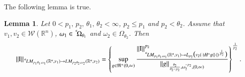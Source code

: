 \documentclass[11pt]{amsart}
\theoremstyle{plain}
\newtheorem{lem}[thm]{Lemma}
\theoremstyle{definition}
\numberwithin{thm}{section}
\numberwithin{equation}{section}
\begin{document}
The following lemma is true.
\begin{lem}\label{mainlemma}
	Let $0 < p_1, \,p_2, \,{\theta}_1, \,{\theta}_2 < \infty$, $p_2 \leq p_1$ and $p_2 < {\theta}_2$. Assume that $v_1, v_2\in {{\mathcal W}}({{\mathbb R}^n})$, ${\omega}_1 \in {\,^{^{\bf c}}\!}{{\Omega}_{{\theta}_1}}$ and ${\omega}_2\in {\Omega}_{{\theta}_2}$. Then
	\begin{align*}
	\|{\operatorname{I}}\|_{{\,^{^{\bf c}}\!} LM_{p_1{\theta}_1,{\omega}_1}({{\mathbb R}^n},v_1){\rightarrow} LM_{p_2{\theta}_2,{\omega}_2}({{\mathbb R}^n},v_2)}
	= \left\{\sup_{g\in {\mathfrak M}^+{(0,{\infty})}} {\frac{\displaystyle {\|{\operatorname{I}}\|_{{\,^{^{\bf c}}\!} LM_{p_1{\theta}_1,{\omega}_1}({{\mathbb R}^n},v_1){\rightarrow} L_{p_2}\big(v_2(\cdot)H^*g(|\cdot|)^{\frac{1}{p_2}}\big)}^{p_2}}}{\displaystyle {\|g\|_{\frac{{\theta}_2}{{\theta}_2-p_2},{\omega}_2^{-p_2},(0,\infty)}}}} \right\}^{\frac{1}{p_2}}.
	\end{align*}
\end{lem}
\end{document}
